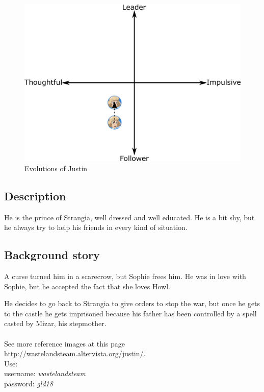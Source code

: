 \begin{figure}[H]
  \centering
   \includegraphics[width=14cm]{Images/Diagrams/Evolutions/justinEvolution}
  \caption{Evolutions of Justin}
\end{figure}

\subsection{Description}
He is the prince of Strangia, well dressed and well educated. He is a bit shy, but he always try to help his friends in every kind of situation.

\subsection{Background story}
A curse turned him in a scarecrow, but Sophie frees him. He was in love with Sophie, but he accepted the fact that she loves Howl.

He decides to go back to Strangia to give orders to stop the war, but once he gets to the castle he gets imprisoned because his father has been controlled by a spell casted by Mizar, his stepmother.\\\\
See more reference images at this page \href{http://wastelandsteam.altervista.org/justin/}{http://wastelandsteam.altervista.org/justin/}.\\
Use:\\
username: \textit{wastelandsteam}\\
password: \textit{gld18}
